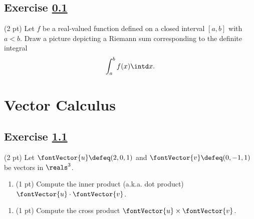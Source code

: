 \subsection{Exercise \ref{sec: Single Variable Calculus Q4}}
\label{sec: Single Variable Calculus Q4}

(2 pt) Let $f$ be a real-valued function defined on a closed interval $[a,b]$ with $a < b$. Draw a picture depicting a Riemann sum corresponding to the definite integral
\begin{align*}
\int_{a}^{b} f(x) \intd x.
\end{align*}






\section{Vector Calculus}



\subsection{Exercise \ref{sec: Vector Calculus Q1}}
\label{sec: Vector Calculus Q1}

(2 pt) Let $\fontVector{u} \defeq (2,0,1)$ and $\fontVector{v} \defeq (0,-1,1)$ be vectors in $\reals^{3}$.
\begin{enumerate}[label=(\alph*)]
\item\label{itm: Vector Calculus Q1a} (1 pt) Compute the inner product (a.k.a. dot product) $\fontVector{u} \cdot \fontVector{v}$.
\end{enumerate}


\begin{enumerate}[resume,label=(\alph*)]
\item\label{itm: Vector Calculus Q1b} (1 pt) Compute the cross product $\fontVector{u} \times \fontVector{v}$.
\end{enumerate}

